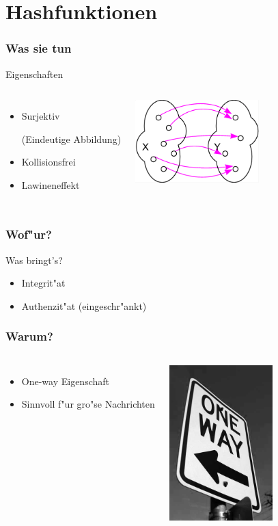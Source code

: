 \section{Hashfunktionen}

\begin{frame}
	\frametitle{Was sie tun}
	Eigenschaften
	\begin{columns}
	\column{6cm}
		\begin{itemize}
			\item Surjektiv \begin{small}(Eindeutige Abbildung)\end{small}
			\item Kollisionsfrei
			\item Lawineneffekt
		\end{itemize}
	\column{6cm}
		\begin{center}
			\includegraphics[width=4.8cm,height=3.2cm]{surjektiv}
		\end{center}
	\end{columns}
\end{frame}

\begin{frame}
	\frametitle{Wof"ur?}
	Was bringt's?
	\begin{itemize}
		\item Integrit"at
		\item Authenzit"at \small{(eingeschr"ankt)}
	\end{itemize}

\end{frame}

\begin{frame}
\frametitle{Warum?}
	\begin{columns}
	\column{6cm}
		\begin{itemize}
			\item One-way Eigenschaft
			\item Sinnvoll f"ur gro"se Nachrichten
		\end{itemize}
	\column{6cm}
		\begin{center}
			\includegraphics[width=4cm,height=6cm]{oneway}
		\end{center}
	\end{columns}
\end{frame}

